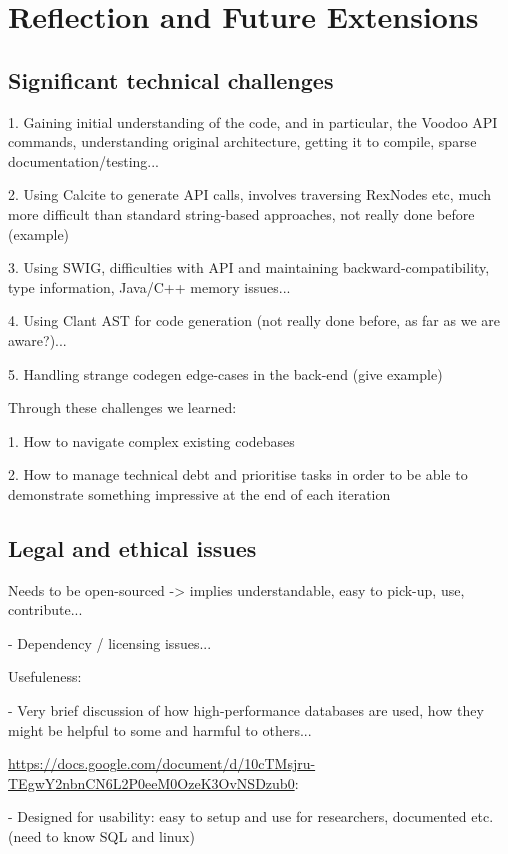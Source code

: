 \chapter{Reflection and Future Extensions}

\section{Significant technical challenges}

1. Gaining initial understanding of the code, and in particular, the Voodoo API commands, understanding original architecture, getting it to compile, sparse documentation/testing...

2. Using Calcite to generate API calls, involves traversing RexNodes etc, much more difficult than standard string-based approaches, not really done before (example)

3. Using SWIG, difficulties with API and maintaining backward-compatibility, type information, Java/C++ memory issues...

4. Using Clant AST for code generation (not really done before, as far as we are aware?)...

5. Handling strange codegen edge-cases in the back-end (give example)

Through these challenges we learned:

1. How to navigate complex existing codebases

2. How to manage technical debt and prioritise tasks in order to be able to demonstrate something impressive at the end of each iteration

\section{Legal and ethical issues}

Needs to be open-sourced -> implies understandable, easy to pick-up, use, contribute...

- Dependency / licensing issues...

Usefuleness:

- Very brief discussion of how high-performance databases are used, how they might be helpful to some and harmful to others...

\url{https://docs.google.com/document/d/10cTMsjru-TEgwY2nbnCN6L2P0eeM0OzeK3OvNSDzub0}:

- Designed for usability: easy to setup and use for researchers, documented etc. (need to know SQL and linux)


